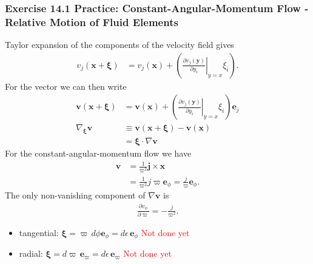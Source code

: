 \documentclass[10pt,a4paper]{book}
\theoremstyle{definition}
\begin{document}
\subsubsection{Exercise 14.1 Practice: Constant-Angular-Momentum Flow - Relative Motion of Fluid Elements}
Taylor expansion of the components of the velocity field gives
\begin{align}
    v_j(\mathbf{x}+\boldsymbol\xi)
    &= v_j(\mathbf{x})+\left(\left.\frac{\partial v_j(\mathbf{y})}{\partial y_i}\right|_{y=x}\xi_i\right).
\end{align}
For the vector we can then write
\begin{align}
    \mathbf{v}(\mathbf{x}+\boldsymbol\xi)
    &= \mathbf{v}(\mathbf{x})+\left(\left.\frac{\partial v_j(\mathbf{y})}{\partial y_i}\right|_{y=x}\xi_i\right) \mathbf{e}_j\\
    \nabla_{\boldsymbol\xi}\mathbf{v}
    &\equiv\mathbf{v}(\mathbf{x}+\boldsymbol\xi) - \mathbf{v}(\mathbf{x})\\
    &=\boldsymbol\xi\cdot\nabla\mathbf{v}
\end{align}
For the constant-angular-momentum flow we have
\begin{align}
    \mathbf{v}&=\frac{1}{\varpi^2}\mathbf{j}\times\mathbf{x}\\
    &=\frac{1}{\varpi^2}j\varpi\mathbf{e}_\phi = \frac{j}{\varpi}\mathbf{e}_\phi.
\end{align}
The only non-vanishing component of $\nabla\mathbf{v}$ is
\begin{align}
    \frac{\partial v_\phi}{\partial \varpi}=-\frac{j}{\varpi^2}.
\end{align}

\begin{itemize}
    \item tangential: $\boldsymbol\xi=\varpi\, d\phi\mathbf{e}_\phi=d\epsilon\,\mathbf{e}_\phi$
    \textcolor{red}{Not done yet}
    \item radial: $\boldsymbol\xi=d\varpi\, \mathbf{e}_\varpi=d\epsilon\,\mathbf{e}_\varpi$
    \textcolor{red}{Not done yet}
\end{itemize}
\end{document}
